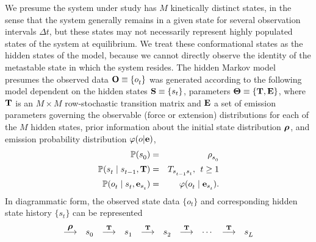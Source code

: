 \documentclass[aps,pre,twocolumn,superscriptaddress,nofootinbib,longbibliography]{revtex4-1}
\newcommand{\bfv}[1]{{\mbox{\boldmath{$#1$}}}}
\newcommand{\bfm}[1]{{\bf #1}}
\begin{document}
{We presume the system under study has $M$ kinetically distinct states, in the sense that the system generally remains in a given state for several observation intervals $\Delta t$, but these states may not necessarily represent highly populated states of the system at equilibrium.
We treat these conformational states as the hidden states of the model, because we cannot directly observe the identity of the metastable state in which the system resides.
The hidden Markov model presumes the observed data $\bfm{O} \equiv \{o^{}_t\}$ was generated according to the following model dependent on {\color{red} the hidden states $\bfm{S} \equiv \{s_t\}$,} parameters $\bfm{\Theta} \equiv \{\bfm{T}, \bfm{E}\}$, where $\bfm{T}$ is an $M \times M$ row-stochastic transition matrix and $\bfm{E}$ a set of emission parameters governing the observable (force or extension) distributions for each of the $M$ hidden states, prior information about the initial state distribution $\bfv{\rho}^{}$, {\color{red} and emission probability distribution $\varphi(o | \bfm{e})$},
\begin{eqnarray}
\mathbb{P}(s^{}_0) &=& \rho^{}_{s^{}_0} \nonumber \\
\mathbb{P}(s^{}_t \mid s^{}_{t-1}, \bfm{T}) &=& T_{s^{}_{t-1} s^{}_{t}} , \:\: t \ge 1 \nonumber \\
\mathbb{P}(o^{}_t \mid s^{}_t, \bfm{e}_{s^{}_{t}}) &=& \varphi(o^{}_{t} \mid \bfm{e}_{s^{}_{t}}) \label{equation:hmm-process} .
\end{eqnarray}
In diagrammatic form, the observed state data $\{o_t\}$ and corresponding hidden state history $\{s_t\}$ can be represented 
\begin{eqnarray}
\begin{array}{llllllllll}
 \stackrel{\bfv{\rho}}{\longrightarrow} & s^{}_{0} & \stackrel{\bfm{T}}{\longrightarrow} & s^{}_{1} & \stackrel{\bfm{T}}{\longrightarrow} & s^{}_{2} & \stackrel{\bfm{T}}{\longrightarrow} & \cdots & \stackrel{\bfm{T}}{\longrightarrow} & s^{}_{L^{}} \\

\end{array}
\end{eqnarray}}
\end{document}
